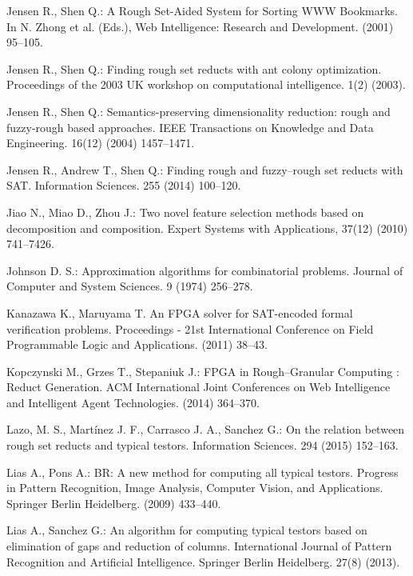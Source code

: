 \documentclass[11pt]{article}   %
\begin{document}
\begin{thebibliography}{}
	Jensen R., Shen Q.:
	A Rough Set-Aided System for Sorting WWW Bookmarks. 
	In N. Zhong et al. (Eds.), Web Intelligence: Research and Development. (2001) 95--105.	
	
	Jensen R., Shen Q.:
	Finding rough set reducts with ant colony optimization.
	Proceedings of the 2003 UK workshop on computational intelligence. 1(2) (2003).

	Jensen R., Shen Q.:
	Semantics-preserving dimensionality reduction: rough and fuzzy-rough based approaches.
	IEEE Transactions on Knowledge and Data Engineering. 16(12) (2004) 1457--1471.
	
	Jensen R., Andrew T., Shen Q.:
	Finding rough and fuzzy--rough set reducts with SAT.
	Information Sciences. 255 (2014) 100--120.
	
	Jiao N., Miao D., Zhou J.:
 	Two novel feature selection methods based on decomposition and composition.
 	Expert Systems with Applications, 37(12) (2010) 741--7426.
 	
	Johnson D. S.:
	Approximation algorithms for combinatorial problems. 
	Journal of Computer and System Sciences. 9 (1974) 256--278.

	Kanazawa K., Maruyama T.
	An FPGA solver for SAT-encoded formal verification problems. 
	Proceedings - 21st International Conference on Field Programmable Logic and Applications. (2011) 38--43.

	Kopczynski M., Grzes T., Stepaniuk J.:
	FPGA in Rough--Granular Computing : Reduct Generation.
	ACM International Joint Conferences on Web Intelligence and Intelligent Agent Technologies. (2014) 364--370. 

	Lazo, M. S., Martínez J. F., Carrasco J. A., Sanchez G.:
	On the relation between rough set reducts and typical testors.
	Information Sciences. 294 (2015) 152--163.

	 Lias A., Pons A.:
	 BR: A new method for computing all typical testors.
	 Progress in Pattern Recognition, Image Analysis, Computer Vision, and Applications. 
	 Springer Berlin Heidelberg. (2009) 433--440.

	 Lias A., Sanchez G.:
	 An algorithm for computing typical testors based on elimination of gaps and reduction of columns.
	 International Journal of Pattern Recognition and Artificial Intelligence. 
	 Springer Berlin Heidelberg. 27(8) (2013).


\end{thebibliography}
\end{document}
